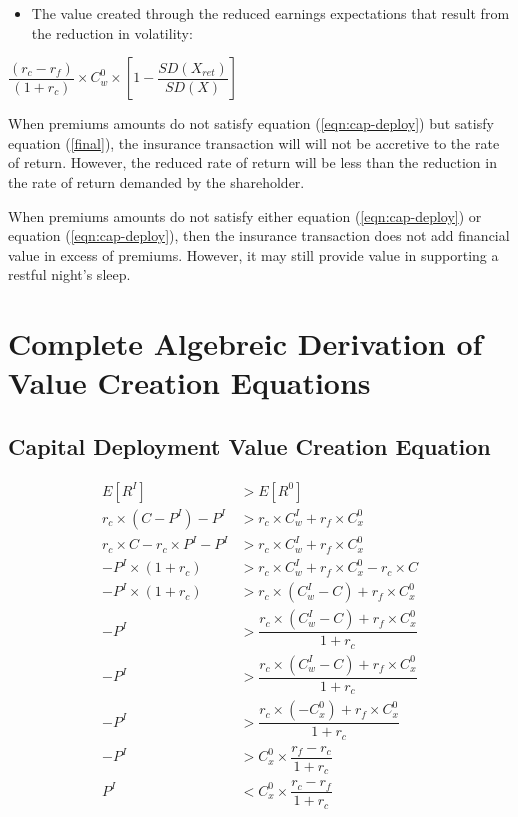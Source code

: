 \documentclass[
]{article}
\providecommand{\tightlist}{%
  \setlength{\itemsep}{0pt}\setlength{\parskip}{0pt}}
\begin{document}
\begin{itemize}
\tightlist
\item
  The value created through the reduced earnings expectations that
  result from the reduction in volatility:
\end{itemize}

\(\dfrac{(r_c-r_f)}{(1 + r_c)} \times C_{w}^{0} \times \left[1 - \dfrac{SD(X_{ret})}{SD(X)}\right]\)

When premiums amounts do not satisfy equation (\ref{eqn:cap-deploy}) but
satisfy equation (\ref{final}), the insurance transaction will will not
be accretive to the rate of return. However, the reduced rate of return
will be less than the reduction in the rate of return demanded by the
shareholder.

When premiums amounts do not satisfy either equation
(\ref{eqn:cap-deploy}) or equation (\ref{eqn:cap-deploy}), then the
insurance transaction does not add financial value in excess of
premiums. However, it may still provide value in supporting a restful
night's sleep.

\newpage
\appendix

\hypertarget{complete-algebreic-derivation-of-value-creation-equations}{%
\section{Complete Algebreic Derivation of Value Creation
Equations}\label{complete-algebreic-derivation-of-value-creation-equations}}

\hypertarget{capital-deployment-value-creation-equation-1}{%
\subsection{Capital Deployment Value Creation
Equation}\label{capital-deployment-value-creation-equation-1}}

\begin{align}
\nonumber E[R^I] &> E[R^0] \\
\nonumber r_c \times (C - P^{I}) - P^{I} &> r_c \times C_{w}^{I} + r_f \times C_{x}^{0} \\
\nonumber r_c \times C - r_c \times P^{I} - P^{I} &>  r_c \times C_{w}^{I} + r_f \times C_{x}^{0}\\
\nonumber -P^{I} \times (1 + r_c) &> r_c \times C_{w}^{I} + r_f \times C_{x}^{0} - r_c \times C\\
\nonumber -P^{I} \times (1 + r_c) &> r_c \times (C_{w}^{I} - C) + r_f \times C_{x}^{0}\\
\nonumber -P^{I}  &> \dfrac{r_c \times (C_{w}^{I} - C) + r_f \times C_{x}^{0}}{1 + r_c}\\
\nonumber -P^{I} &> \dfrac{r_c \times (C_{w}^{I} - C) + r_f \times C_{x}^{0}}{1 + r_c}\\
\nonumber -P^{I} &> \dfrac{r_c \times (-C_{x}^{0}) + r_f \times C_{x}^{0}}{1 + r_c}\\
\nonumber -P^{I} &> C_{x}^{0} \times \dfrac{r_f - r_c}{1 + r_c}\\
P^{I} &< C_{x}^{0} \times \dfrac{r_c - r_f}{1 + r_c} \label{eqn:cap-deploy}
\end{align}
\end{document}
